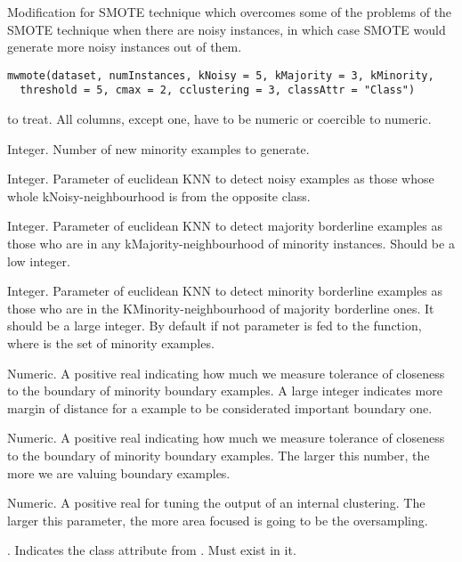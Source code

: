 
%
\begin{Description}\relax
Modification for SMOTE technique which overcomes some of the problems of the
SMOTE technique when there are noisy instances, in which case SMOTE would
generate more noisy instances out of them.
\end{Description}
%
\begin{Usage}
\begin{verbatim}
mwmote(dataset, numInstances, kNoisy = 5, kMajority = 3, kMinority,
  threshold = 5, cmax = 2, cclustering = 3, classAttr = "Class")
\end{verbatim}
\end{Usage}
%
\begin{Arguments}
\begin{ldescription}
\item[\code{dataset}]  to treat. All columns, except
 one, have to be numeric or coercible to numeric.

\item[\code{numInstances}] Integer. Number of new minority examples to generate.

\item[\code{kNoisy}] Integer. Parameter of euclidean KNN to detect noisy examples as
those whose whole kNoisy-neighbourhood is from the opposite class.

\item[\code{kMajority}] Integer. Parameter of euclidean KNN to detect majority
borderline examples as those who are in any kMajority-neighbourhood of
minority instances. Should be a low integer.

\item[\code{kMinority}] Integer. Parameter of euclidean KNN to detect minority
borderline examples as those who are in the KMinority-neighbourhood of
majority borderline ones. It should be a large integer. By default if not
parameter is fed to the function,  where  is the
set of minority examples.

\item[\code{threshold}] Numeric. A positive real indicating how much we measure
tolerance of closeness to the boundary of minority boundary examples. A
large integer indicates more margin of distance for a example to be
considerated important boundary one.

\item[\code{cmax}] Numeric. A positive real indicating how much we measure tolerance
of closeness to the boundary of minority boundary examples. The larger this
number, the more we are valuing boundary examples.

\item[\code{cclustering}] Numeric. A positive real for tuning the output of an
internal clustering. The larger this parameter, the more area focused is
going to be the oversampling.

\item[\code{classAttr}] . Indicates the class attribute from
. Must exist in it.
\end{ldescription}
\end{Arguments}
